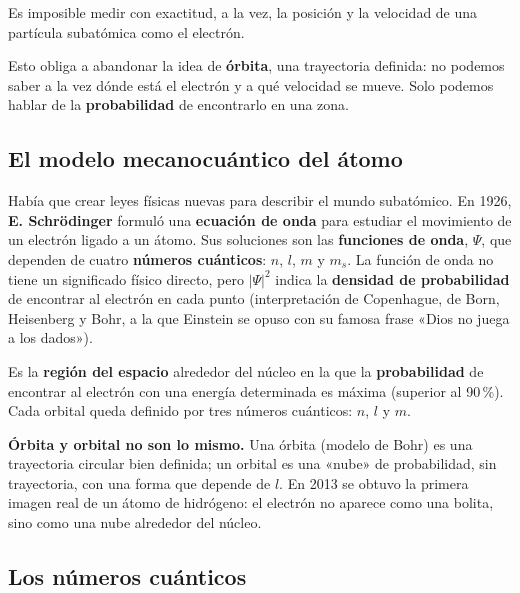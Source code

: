 \begin{definition}
    Es imposible medir con exactitud, a la vez, la posición y la velocidad de una partícula subatómica como el electrón.
\end{definition}

Esto obliga a abandonar la idea de \textbf{órbita}, una trayectoria definida: no podemos saber a la vez dónde está el electrón y
a qué velocidad se mueve. Solo podemos hablar de la \textbf{probabilidad} de encontrarlo en una zona.

\subsection{El modelo mecanocuántico del átomo}

Había que crear leyes físicas nuevas para describir el mundo subatómico. En 1926, \textbf{E. Schrödinger} formuló una
\textbf{ecuación de onda} para estudiar el movimiento de un electrón ligado a un átomo. Sus soluciones son las
\textbf{funciones de onda}, \(\Psi\), que dependen de cuatro \textbf{números cuánticos}: \(n\), \(l\), \(m\) y \(m_s\). La función
de onda no tiene un significado físico directo, pero \(|\Psi|^2\) indica la \textbf{densidad de probabilidad} de encontrar al
electrón en cada punto (interpretación de Copenhague, de Born, Heisenberg y Bohr, a la que Einstein se opuso con su famosa frase
«Dios no juega a los dados»).

\begin{definition}
    Es la \textbf{región del espacio} alrededor del núcleo en la que la \textbf{probabilidad} de encontrar al electrón con una
    energía determinada es máxima (superior al 90\,\%). Cada orbital queda definido por tres números cuánticos: \(n\), \(l\) y
    \(m\).
\end{definition}

\begin{remark}
    \textbf{Órbita y orbital no son lo mismo.} Una órbita (modelo de Bohr) es una trayectoria circular bien definida; un orbital
    es una «nube» de probabilidad, sin trayectoria, con una forma que depende de \(l\). En 2013 se obtuvo la primera imagen real de
    un átomo de hidrógeno: el electrón no aparece como una bolita, sino como una nube alrededor del núcleo.
\end{remark}

\subsection{Los números cuánticos}


